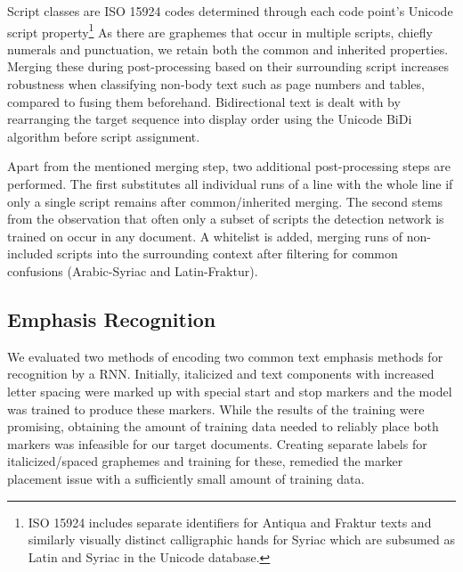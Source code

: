 Script classes are ISO 15924 codes determined through each code point's Unicode
script property\footnote{ISO 15924 includes separate identifiers for Antiqua
and Fraktur texts and similarly visually distinct calligraphic hands for Syriac
which are subsumed as Latin and Syriac in the Unicode database.} As there are
graphemes that occur in multiple scripts, chiefly numerals and punctuation, we
retain both the common and inherited properties. Merging these during
post-processing based on their surrounding script increases robustness when
classifying non-body text such as page numbers and tables, compared to fusing
them beforehand. Bidirectional text is dealt with by rearranging the target
sequence into display order using the Unicode BiDi algorithm before script
assignment.

Apart from the mentioned merging step, two additional post-processing steps are
performed. The first substitutes all individual runs of a line with the whole
line if only a single script remains after common/inherited merging. The second
stems from the observation that often only a subset of scripts the detection
network is trained on occur in any document. A whitelist is added, merging
runs of non-included scripts into the surrounding context after filtering for
common confusions (Arabic-Syriac and Latin-Fraktur).

\subsection{Emphasis Recognition}
\label{sec:emph}

We evaluated two methods of encoding two common text emphasis methods for
recognition by a RNN. Initially, italicized and text components with increased
letter spacing were marked up with special start and stop markers and the model
was trained to produce these markers. While the results of the training were
promising, obtaining the amount of training data needed to reliably place both
markers was infeasible for our target documents. Creating separate labels for
italicized/spaced graphemes and training for these, remedied the marker
placement issue with a sufficiently small amount of training data.

